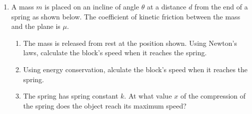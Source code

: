 \documentclass{../../../oss-classkick}
\begin{document}
\begin{enumerate}[leftmargin=15pt]

\item A mass $m$ is placed on an incline of angle $\theta$ at a distance $d$
  from the end of a spring as shown below. The coefficient of kinetic friction
  between the mass and the plane is $\mu$.
  \begin{enumerate}
  \item The mass is released from rest at the position shown. Using Newton's
    laws, calculate the block's speed when it reaches the spring.
  \item Using energy conservation, alculate the block's speed when it reaches
    the spring.
  \item The spring has spring constant $k$. At what value $x$ of the compression
    of the spring does the object reach its maximum speed?
  \end{enumerate}
  \newpage
  

\end{enumerate}
\end{document}

